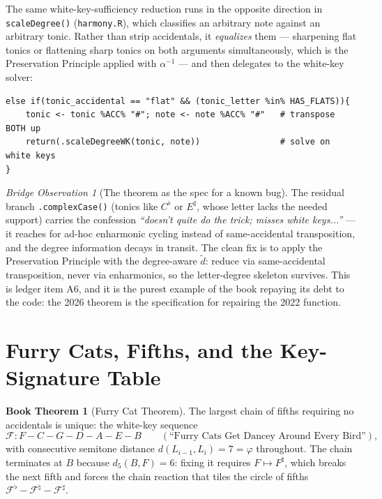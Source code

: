 \documentclass[11pt]{article}
\newcommand{\FC}{\mathcal{F}}                   %
\newcommand{\dist}{\tilde{d}}                   %
\theoremstyle{definition}
\newtheorem{bookthm}[bookdef]{Book Theorem}
\theoremstyle{remark}
\newtheorem{bridge}{Bridge Observation}[section]
\newcommand{\code}[1]{\texttt{#1}}
\newcommand{\file}[1]{\texttt{#1}}
\begin{document}
The same white-key-sufficiency reduction runs in the opposite direction in
\code{scaleDegree()} (\file{harmony.R}), which classifies an arbitrary note
against an arbitrary tonic. Rather than strip accidentals, it \emph{equalizes}
them --- sharpening flat tonics or flattening sharp tonics on both arguments
simultaneously, which is the Preservation Principle applied with
$\alpha^{-1}$ --- and then delegates to the white-key solver:

\begin{lstlisting}
else if(tonic_accidental == "flat" && (tonic_letter %in% HAS_FLATS)){
    tonic <- tonic %ACC% "#"; note <- note %ACC% "#"   # transpose BOTH up
    return(.scaleDegreeWK(tonic, note))                # solve on white keys
}
\end{lstlisting}

\begin{bridge}[The theorem as the spec for a known bug]\label{obs:complexcase}
The residual branch \code{.complexCase()} (tonics like $C^{\flat}$ or
$E^{\sharp}$, whose letter lacks the needed support) carries the confession
\emph{``doesn't quite do the trick; misses white keys...''} --- it reaches for
ad-hoc enharmonic cycling instead of same-accidental transposition, and the
degree information decays in transit. The clean fix is to apply the
Preservation Principle with the degree-aware $\dist$: reduce via
same-accidental transposition, never via enharmonics, so the letter-degree
skeleton survives. This is ledger item A6, and it is the purest example of the
book repaying its debt to the code: the 2026 theorem is the specification for
repairing the 2022 function.
\end{bridge}

\section{Furry Cats, Fifths, and the Key-Signature Table}\label{sec:furrycat}

\begin{bookthm}[Furry Cat Theorem]
The largest chain of fifths requiring no accidentals is unique: the white-key
sequence
$$\FC : F - C - G - D - A - E - B
\qquad (\text{``Furry Cats Get Dancey Around Every Bird''}),$$
with consecutive semitone distance $d(L_{i-1}, L_i) = 7 = \varphi$ throughout.
The chain terminates at $B$ because $d_5(B, F) = 6$: fixing it requires
$F \mapsto F^{\sharp}$, which breaks the next fifth and forces the chain
reaction that tiles the circle of fifths
$\FC^{\flat} - \FC^{\natural} - \FC^{\sharp}$.
\end{bookthm}
\end{document}
